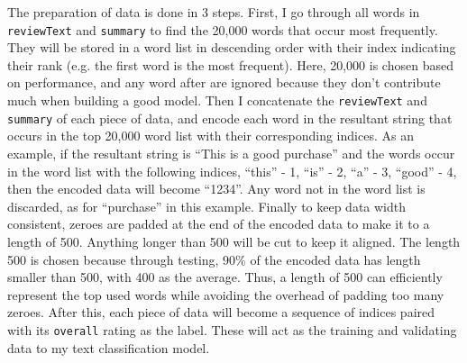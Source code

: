 \documentclass[12pt]{article}
\begin{document}
The preparation of data is done in 3 steps. First, I go through all words in \texttt{reviewText} and \texttt{summary} to find the 20,000 words that occur most frequently. They will be stored in a word list in descending order with their index indicating their rank (e.g. the first word is the most frequent). Here, 20,000 is chosen based on performance, and any word after are ignored because they don’t contribute much when building a good model. Then I concatenate the \texttt{reviewText} and \texttt{summary} of each piece of data, and encode each word in the resultant string that occurs in the top 20,000 word list with their corresponding indices. As an example, if the resultant string is “This is a good purchase” and the words occur in the word list with the following indices,
“this” - 1,  “is” - 2,  “a” - 3,  “good” - 4,
then the encoded data will become “1234”. Any word not in the word list is discarded, as for “purchase” in this example. Finally to keep data width consistent, zeroes are padded at the end of the encoded data to make it to a length of 500. Anything longer than 500 will be cut to keep it aligned. The length 500 is chosen because through testing,  90\% of the encoded data has length smaller than 500, with 400 as the average. Thus, a length of 500 can efficiently represent the top used words while avoiding the overhead of padding too many zeroes. After this, each piece of data will become a sequence of indices paired with its \texttt{overall} rating as the label. These will act as the training and validating data to my text classification model.
\end{document}
